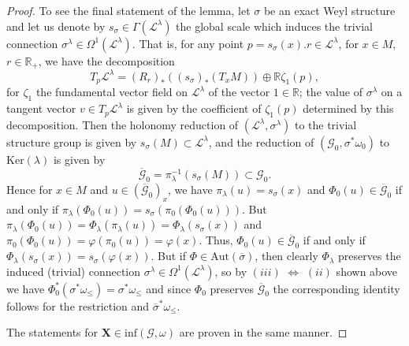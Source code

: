 \documentclass[pdftex]{sigma}
\def\R{\mathbb{R}}
\def\Gbdle{\mathcal{G}}
\def\dsum{\oplus}
\theoremstyle{plain}
\theoremstyle{definition}
\begin{document}
\begin{proof}
 To see the f\/inal statement of the lemma, let $\sigma$ be an exact Weyl structure and let us denote by $s_{\sigma} \in \Gamma(\mathcal{L}^{\lambda})$ the global scale which induces the trivial connection $\sigma^{\lambda} \in \Omega^1(\mathcal{L}^{\lambda})$. That is, for any point $p = s_{\sigma}(x).r \in \mathcal{L}^{\lambda}$, for $x \in M$, $r \in \R_+$, we have the decomposition
\[
T_p \mathcal{L}^{\lambda} = (R_r)_*((s_{\sigma})_*(T_xM)) \dsum \R \zeta_1(p),
\]
for $\zeta_1$ the fundamental vector f\/ield on $\mathcal{L}^{\lambda}$ of the vector $1 \in \R$; the value of $\sigma^{\lambda}$ on a tangent vector $v \in T_p\mathcal{L}^{\lambda}$ is given by the coef\/f\/icient of $\zeta_1(p)$ determined by this decomposition. Then the holonomy reduction of $(\mathcal{L}^{\lambda},\sigma^{\lambda})$ to the trivial structure group is given by $s_{\sigma}(M) \subset \mathcal{L}^{\lambda}$, and the reduction of $(\Gbdle_0,\sigma^*\omega_0)$ to $\mathrm{Ker}(\lambda)$ is given by
\[
\overline{\Gbdle}_0 = \pi_{\lambda}^{-1}(s_{\sigma}(M)) \subset \Gbdle_0.
\]
Hence for $x \in M$ and $u \in (\overline{\Gbdle}_0)_x$, we have $\pi_{\lambda}(u) = s_{\sigma}(x)$ and $\Phi_0(u) \in \overline{\Gbdle}_0$ if and only if $\pi_{\lambda}(\Phi_0(u)) = s_{\sigma}(\pi_0(\Phi_0(u)))$. But $\pi_{\lambda}(\Phi_0(u)) = \Phi_{\lambda}(\pi_{\lambda}(u)) = \Phi_{\lambda}(s_{\sigma}(x))$ and $\pi_0(\Phi_0(u)) = \varphi(\pi_0(u)) = \varphi(x)$. Thus, $\Phi_0(u) \in \overline{\Gbdle}_0$ if and only if $\Phi_{\lambda}(s_{\sigma}(x)) = s_{\sigma}(\varphi(x))$. But if $\Phi \in \mathrm{Aut}(\overline{\sigma})$, then clearly $\Phi_{\lambda}$ preserves the induced (trivial) connection $\sigma^{\lambda} \in \Omega^1(\mathcal{L}^{\lambda})$, so by $(iii)$ $\Leftrightarrow$ $(ii)$ shown above we have $\Phi_0^*(\sigma^*\omega_{\leq}) = \sigma^*\omega_{\leq}$ and since $\Phi_0$ preserves $\overline{\Gbdle}_0$ the corresponding identity follows for the restriction and $\overline{\sigma}^*\omega_{\leq}$.

 The statements for $\mathbf{X} \in \mathrm{inf}(\Gbdle,\omega)$ are proven in the same manner.
 \end{proof}
\end{document}
